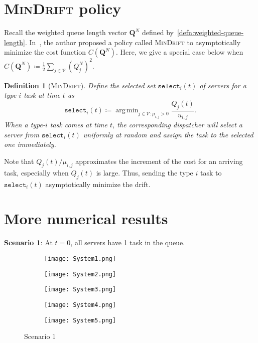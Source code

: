 \documentclass[11pt, reqno]{article}
\newtheorem{defn}[theorem]{Definition}
\numberwithin{equation}{section}
\numberwithin{theorem}{section}
\newcommand{\sel}{\texttt{select}}
\DeclareMathOperator*{\argmin}{arg\,min}
\begin{document}
\section{\textsc{MinDrift} policy~\cite{AS05}}\label{sec:MinDrift}
Recall the weighted queue length vector $\mathbf{Q}^N$ defined by~\eqref{defn:weighted-queue-length}.
In~\cite{AS05}, the author proposed a policy called \textsc{MinDrift} to asymptotically minimize the cost function $C(\mathbf{Q}^N)$. Here, we give a special case below when $C(\mathbf{Q}^N)\coloneqq\frac{1}{2}\sum_{j\in\mathcal{V}}(Q^N_j)^2$.

\begin{defn}[\textsc{MinDrift}]\label{def:MinDrift}
Define the selected set $\sel_i{(t)}$ of servers for a type $i$ task at time $t$ as $$\sel_i{(t)}\coloneqq\argmin_{j\in \mathcal{V}:\mu_{i,j}>0} \frac{Q_j(t)}{u_{i,j}}.$$
When a type-$i$ task comes at time $t$, the corresponding dispatcher will select a server from $\sel_i(t)$ uniformly at random and assign the task to the selected one immediately. 
\end{defn}
Note that $Q_j(t)/\mu_{i,j}$ approximates the increment of the cost for an arriving task, especially when $Q_j(t)$ is large. 
Thus, sending the type $i$ task to $\sel_i(t)$ asymptotically minimize the drift. 

\section{More numerical results}\label{app:more-numerical}
\textbf{Scenario 1}: At $t=0$, all servers have 1 task in the queue.
\begin{figure}[!htb]
     \centering
     \begin{subfigure}[b]{0.3\textwidth}
         \centering
         \texttt{[image: System1.png]}
     \end{subfigure}
     \hfill
     \begin{subfigure}[b]{0.3\textwidth}
         \centering
         \texttt{[image: System2.png]}
     \end{subfigure}
     \hfill
     \begin{subfigure}[b]{0.3\textwidth}
         \centering
         \texttt{[image: System3.png]}
     \end{subfigure}
     \hfill
     \begin{subfigure}[b]{0.3\textwidth}
         \centering
         \texttt{[image: System4.png]}
     \end{subfigure}
     \begin{subfigure}[b]{0.3\textwidth}
         \centering
         \texttt{[image: System5.png]}
     \end{subfigure}
     \caption{Scenario 1}
    \label{fig:sample path-busy}
\end{figure}
\end{document}
